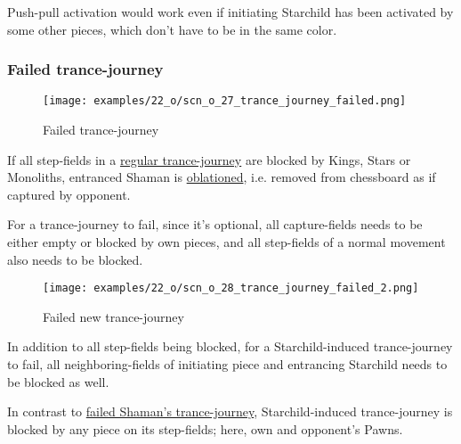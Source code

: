 Push-pull activation would work even if initiating Starchild has been activated by
some other pieces, which don't have to be in the same color.

\clearpage %

\subsubsection*{Failed trance-journey}

\vspace*{-1.1\baselineskip}
\noindent
\begin{figure}[!h]
\texttt{[image: examples/22\_o/scn\_o\_27\_trance\_journey\_failed.png]}
\caption{Failed trance-journey}
\label{fig:scn_o_27_trance_journey_failed}
\end{figure}

If all step-fields in a
\hyperref[fig:scn_cot_09_trance_journey_init]{regular trance-journey}
are blocked by Kings, Stars or Monoliths, entranced Shaman is
\hyperref[sec:Terms/Oblation]{oblationed}, i.e. removed from chessboard
as if captured by opponent.

For a trance-journey to fail, since it's optional, all capture-fields needs
to be either empty or blocked by own pieces, and all step-fields of a normal
movement also needs to be blocked.

\clearpage %

\noindent
\begin{figure}[!h]
\texttt{[image: examples/22\_o/scn\_o\_28\_trance\_journey\_failed\_2.png]}
\caption{Failed new trance-journey}
\label{fig:scn_o_28_trance_journey_failed_2}
\end{figure}

In addition to all step-fields being blocked, for a Starchild-induced trance-journey
to fail, all neighboring-fields of initiating piece and entrancing Starchild needs
to be blocked as well.

In contrast to
\hyperref[fig:scn_o_27_trance_journey_failed]{failed Shaman's trance-journey},
Starchild-induced trance-journey is blocked by any piece on its step-fields;
here, own and opponent's Pawns.

\clearpage %

